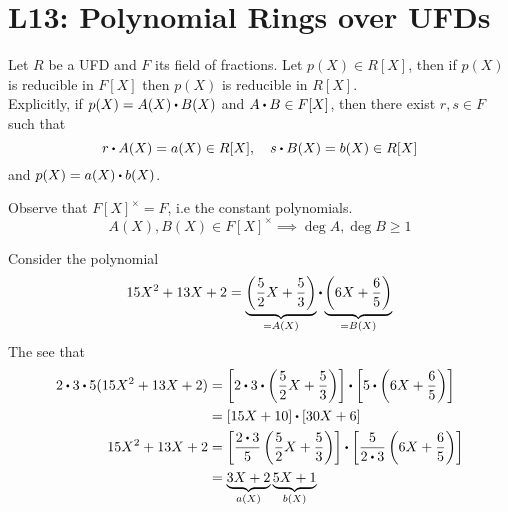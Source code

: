 \documentclass[../Main.tex]{subfiles}
\begin{document}
\chapter{L13: Polynomial Rings over UFDs}

\begin{lem}[title = Gauss' Lemma]
	Let $R$ be a UFD and $F$ its field of fractions. Let $p(X)\in R[X]$, then if $p(X)$ is reducible in $F[X]$ then $p(X)$ is reducible in $R[X]$.\\
	Explicitly, if $p(X)=A(X)\rdot B(X)$ and $A\rdot B\in F[X]$, then there exist $r,s\in F$ such that 
	\[r\rdot A(X) = a(X)\in R[X],\quad s\rdot B(X) = b(X) \in R[X]\]
	and $p(X) = a(X)\rdot b(X)$.
\end{lem}
Observe that $F[X]^\times = F$, i.e the constant polynomials. 
\[A(X),B(X) \in F[X]^\times \implies \deg A, \deg B \ge 1\]
\begin{example}
	Consider the polynomial
	\[15X^2+13X+2 = \underbrace{\left(\frac{5}{2}X + \frac{5}{3}\right)}_{=A(X)}\rdot  \underbrace{\left(6X + \frac{6}{5}\right)}_{=B(X)}\]
	The see that
	\begin{align*}
	2\rdot 3\rdot 5(15X^2+13X+2) &= \left[2\rdot 3 \rdot \left(\frac{5}{2}X + \frac{5}{3}\right) \right] \rdot  \left[5\rdot \left(6X + \frac{6}{5}\right)\right] \\
	&= [15X+10] \rdot{}  [30X+6]\\
	15X^2+13X+2&=\left[\frac{2\rdot 3}{5}\left(\frac{5}{2}X+\frac{5}{3}\right)\right]\rdot \left[\frac{5}{2\rdot 3}\left(6X+\frac{6}{5}\right)\right]\\
	&= \underbrace{3X+2}_{a(X)} \underbrace{5X+1}_{b(X)}
	\end{align*}
\end{example}	
\end{document}
